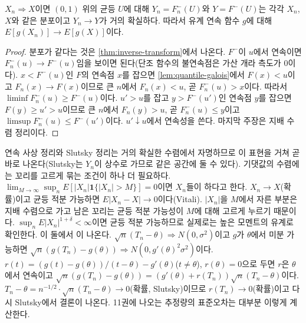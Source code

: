 \begin{proposition}[Skorokhod 표현]
\label{prop:skorokhod}
$X_n\Rightarrow X$이면 $(0,1)$ 위의 균등 $U$에 대해 $Y_n=F_n^{-}(U)$와 $Y=F^{-}(U)$는 각각 $X_n$, $X$와 같은 분포이고 $Y_n\to Y$가 거의 확실하다. 따라서 유계 연속 함수 $g$에 대해 $E[g(X_n)]\to E[g(X)]$이다.
\end{proposition}

\begin{proof}
분포가 같다는 것은 \cref{thm:inverse-transform}에서 나온다. $F^{-}$이 $u$에서 연속이면 $F_n^{-}(u)\to F^{-}(u)$임을 보이면 된다(단조 함수의 불연속점은 가산 개라 측도가 $0$이다). $x<F^{-}(u)$인 $F$의 연속점 $x$를 잡으면 \cref{lem:quantile-galois}에서 $F(x)<u$이고 $F_n(x)\to F(x)$이므로 큰 $n$에서 $F_n(x)<u$, 곧 $F_n^{-}(u)>x$이다. 따라서 $\liminf F_n^{-}(u)\ge F^{-}(u)$이다. $u'>u$를 잡고 $y>F^{-}(u')$인 연속점 $y$를 잡으면 $F(y)\ge u'>u$이므로 큰 $n$에서 $F_n(y)>u$, 곧 $F_n^{-}(u)\le y$이고 $\limsup F_n^{-}(u)\le F^{-}(u')$이다. $u'\downarrow u$에서 연속성을 쓴다. 마지막 주장은 지배 수렴 정리이다.
\end{proof}

연속 사상 정리와 Slutsky 정리는 거의 확실한 수렴에서 자명하므로 이 표현을 거쳐 곧바로 나온다(Slutsky는 $Y_n$이 상수로 가므로 같은 공간에 둘 수 있다). 기댓값의 수렴에는 꼬리를 고르게 묶는 조건이 하나 더 필요하다. $\lim_{M\to\infty}\sup_nE[|X_n|\mathbf 1\{|X_n|>M\}]=0$이면 $X_n$들이 하다고 한다. $X_n\to X$(확률)이고 균등 적분 가능하면 $E|X_n-X|\to0$이다(Vitali). $|X_n|$을 $M$에서 자른 부분은 지배 수렴으로 가고 남은 꼬리는 균등 적분 가능성이 $M$에 대해 고르게 누르기 때문이다. $\sup_nE|X_n|^{1+\delta}<\infty$이면 균등 적분 가능하므로 실제로는 높은 모멘트의 유계로 확인한다. 이 둘에서 이 나온다. $\sqrt n(T_n-\theta)\Rightarrow N(0,\sigma^2)$이고 $g$가 $\theta$에서 미분 가능하면 $\sqrt n(g(T_n)-g(\theta))\Rightarrow N(0,g'(\theta)^2\sigma^2)$이다. $r(t)=(g(t)-g(\theta))/(t-\theta)-g'(\theta)$($t\ne\theta$), $r(\theta)=0$으로 두면 $r$은 $\theta$에서 연속이고 $\sqrt n(g(T_n)-g(\theta))=(g'(\theta)+r(T_n))\sqrt n(T_n-\theta)$이다. $T_n-\theta=n^{-1/2}\cdot\sqrt n(T_n-\theta)\to0$(확률, Slutsky)이므로 $r(T_n)\to0$(확률)이고 다시 Slutsky에서 결론이 나온다. 11권에 나오는 추정량의 표준오차는 대부분 이렇게 계산한다.

